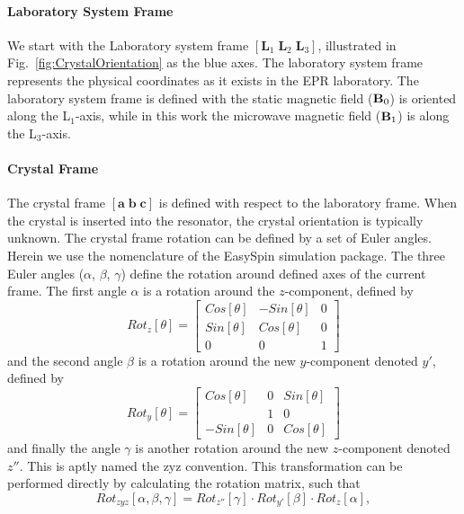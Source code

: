 \paragraph*{Laboratory System Frame} We start with the Laboratory system frame $[\mathbf{L}_1\; \mathbf{L}_2\; \mathbf{L}_3]$, illustrated in Fig.~\ref{fig:CrystalOrientation} as the blue axes. The laboratory system frame represents the physical coordinates as it exists in the EPR laboratory. The laboratory system frame is defined with the static magnetic field (${\textbf B}_0$) is oriented along the L$_1$-axis, while in this work the microwave magnetic field (${\textbf B}_1$) is along the L$_3$-axis. 

\paragraph*{Crystal Frame} The crystal frame $[\mathbf{a}\; \mathbf{b}\; \mathbf{c}]$ is defined with respect to the laboratory frame. When the crystal is inserted into the resonator, the crystal orientation is typically unknown. The crystal frame rotation can be defined by a set of Euler angles. Herein we use the nomenclature of the EasySpin simulation package. \cite{STOLL200642} The three Euler angles ($\alpha$, $\beta$, $\gamma$) define the rotation around defined axes of the current frame. The first angle $\alpha$ is a rotation around the $z$-component, defined by
\begin{equation}
    Rot_z[\theta] = \begin{bmatrix}
   Cos[\theta] & -Sin[\theta] & 0\\
    Sin[\theta] & Cos[\theta] & 0\\
    0 &  0 & 1
   \end{bmatrix}
\end{equation}
and the second angle $\beta$ is a rotation around the new $y$-component denoted $y'$, defined by
\begin{equation}
    Rot_y[\theta] = \begin{bmatrix}
   Cos[\theta] & 0 & Sin[\theta]\\
     & 1 & 0\\
    -Sin[\theta] &  0 & Cos[\theta]
   \end{bmatrix}
\end{equation}
and finally the angle $\gamma$ is another rotation around the new $z$-component denoted $z''$. This is aptly named the zyz convention. This transformation can be performed directly by calculating the rotation matrix, such that
\begin{equation}
    Rot_{zyz}[\alpha, \beta, \gamma] = Rot_{z''}[\gamma] \cdot Rot_{y'}[\beta] \cdot Rot_z[\alpha],
\end{equation}
